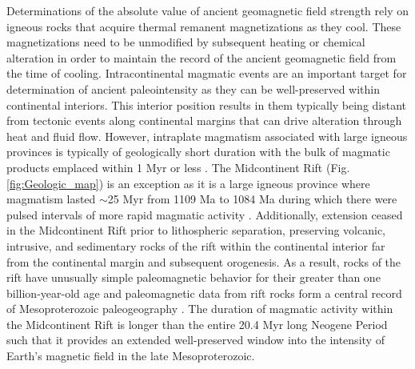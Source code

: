 \documentclass[9pt,twocolumn,twoside,lineno]{pnas-new}
\begin{document}
Determinations of the absolute value of ancient geomagnetic field strength rely on igneous rocks that acquire thermal remanent magnetizations as they cool. These magnetizations need to be unmodified by subsequent heating or chemical alteration in order to maintain the record of the ancient geomagnetic field from the time of cooling. Intracontinental magmatic events are an important target for determination of ancient paleointensity as they can be well-preserved within continental interiors. This interior position results in them typically being distant from tectonic events along continental margins that can drive alteration through heat and fluid flow. However, intraplate magmatism associated with large igneous provinces is typically of geologically short duration with the bulk of magmatic products emplaced within 1 Myr or less \cite{Kasbohm2021a}. The Midcontinent Rift (Fig. \ref{fig:Geologic_map}) is an exception as it is a large igneous province where magmatism lasted $\sim$25 Myr from  1109 Ma to 1084 Ma during which there were pulsed intervals of more rapid magmatic activity \cite{Swanson-Hysell2021a}. Additionally, extension ceased in the Midcontinent Rift prior to lithospheric separation, preserving volcanic, intrusive, and sedimentary rocks of the rift within the continental interior far from the continental margin and subsequent orogenesis. As a result, rocks of the rift have unusually simple paleomagnetic behavior for their greater than one billion-year-old age and paleomagnetic data from rift rocks form a central record of Mesoproterozoic paleogeography \cite{Swanson-Hysell2021c}. The duration of magmatic activity within the Midcontinent Rift is longer than the entire 20.4 Myr long Neogene Period such that it provides an extended well-preserved window into the intensity of Earth's magnetic field in the late Mesoproterozoic. 
\end{document}
